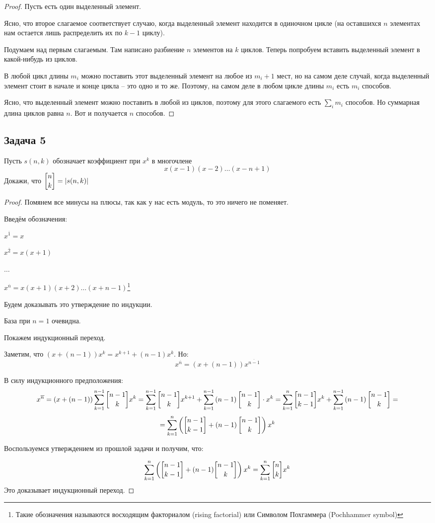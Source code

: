 \begin{proof}
Пусть есть один выделенный элемент.

Ясно, что второе слагаемое соответствует случаю, когда выделенный элемент находится в одиночном цикле (на оставшихся $n$ элементах нам остается лишь распределить их по $k - 1$ циклу).

Подумаем над первым слагаемым. Там написано разбиение $n$ элементов на $k$ циклов. Теперь попробуем вставить выделенный элемент в какой-нибудь из циклов. 

В любой цикл длины $m_i$ можно поставить этот выделенный элемент на любое из $m _i+ 1$ мест, но на самом деле случай, когда выделенный элемент стоит в начале и конце цикла -- это одно и то же. Поэтому, на самом деле в любом цикле длины $m_i$ есть $m_i$ способов. 

Ясно, что выделенный элемент можно поставить в любой из циклов, поэтому для этого слагаемого есть $\sum_{i} m_i$ способов. Но суммарная длина циклов равна $n$. Вот и получается $n$ способов.
\end{proof}

\subsection{Задача 5}

Пусть $s(n,k)$ обозначает коэффициент при $x^k$ в многочлене 
\[
x(x-1)(x-2)\ldots(x-n+1)
\]
Докажи, что $\displaystyle \stirling{n}{k} = |s(n,k)|$

\begin{proof}
Помянем все минусы на плюсы, так как у нас есть модуль, то это ничего не поменяет.

Введём обозначения:

$x^{\overline{1}} = x$

$x^{\overline{2}} = x(x+1)$

$\ldots$

$x^{\overline{n}} = x(x+1)(x+2)\ldots(x+n-1)$\footnote{Такие обозначения называются восходящим факториалом (rising factorial) или Символом Похгаммера (Pochhammer symbol)}

Будем доказывать это утверждение по индукции. 

База при $n = 1$ очевидна.

Покажем индукционный переход.

Заметим, что $(x+(n-1))x^k = x^{k+1} + (n-1)x^k$. Но: 
\[
x^{\overline{n}} = (x+(n-1))x^{\overline{n-1}}
\]

В силу индукционного предположения:
\[
x^{\overline{n}} = \lr{x+\lr{n-1}}\sum_{k=1}^{n-1}{\stirling{n-1}{k}}x^k = \sum_{k=1}^{n-1}{\stirling{n-1}{k}x^{k+1}} + \sum_{k=1}^{n-1}{\lr{n-1}\stirling{n-1}{k}} \cdot x^k = \sum_{k=1}^{n}{\stirling{n-1}{k-1}x^{k}} + \sum_{k=1}^{n-1}{\lr{n-1}\stirling{n-1}{k}} =
\]
\[
= \sum_{k=1}^{n}\lr{\stirling{n-1}{k-1} + \lr{n-1}\stirling{n-1}{k}}x^k
\]

Воспользуемся утверждением из прошлой задачи и получим, что:

\[
\sum_{k=1}^{n}\lr{\stirling{n-1}{k-1} + (n-1)\stirling{n-1}{k}}x^k = \sum_{k=1}^{n}\stirling{n}{k}x^k
\]
Это доказывает индукционный переход.
\end{proof}

